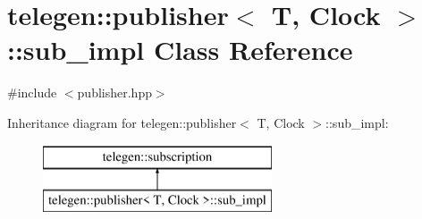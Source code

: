 \hypertarget{classtelegen_1_1publisher_1_1sub__impl}{}\section{telegen\+:\+:publisher$<$ T, Clock $>$\+:\+:sub\+\_\+impl Class Reference}
\label{classtelegen_1_1publisher_1_1sub__impl}


{\ttfamily \#include $<$publisher.\+hpp$>$}

Inheritance diagram for telegen\+:\+:publisher$<$ T, Clock $>$\+:\+:sub\+\_\+impl\+:\begin{figure}[H]
\begin{center}
\leavevmode
\includegraphics[height=2.000000cm]{classtelegen_1_1publisher_1_1sub__impl}
\end{center}
\end{figure}
